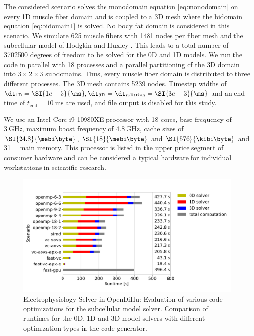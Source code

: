 The considered scenario solves the monodomain equation \cref{eq:monodomain} on every 1D muscle fiber domain and is coupled to a 3D mesh where the bidomain equation \cref{eq:bidomain1} is solved. No body fat domain is considered in this scenario.
We simulate 625 muscle fibers with 1481 nodes per fiber mesh and the subcellular model of Hodgkin and Huxley \cite{Hodgkin1952}. This leads to a total number of \num{3702500} degrees of freedom to be solved for the 0D and 1D models.
We run the code in parallel with 18 processes and a parallel partitioning of the 3D domain into $3 \times 2 \times 3$ subdomains. Thus, every muscle fiber domain is distributed to three different processes.
The 3D mesh contains 5239 nodes. Timestep widths of $\dt_\text{1D} = \SI{1e-3}{\ms}, \dt_\text{3D} = \dt_\text{splitting} = \SI{3e-3}{\ms}$ and an end time of $t_\text{end} = \SI{10}{\ms}$ are used, and file output is disabled for this study.

We use an Intel Core i9-10980XE processor with 18 cores, base frequency of $\SI{3}{\giga\hertz}$, maximum boost frequency of $\SI{4.8}{\giga\hertz}$, cache sizes of 
$\SI{24.8}{\mebi\byte}$, $\SI{18}{\mebi\byte}$ and $\SI{576}{\kibi\byte}$ and \SI{31}{\gibi\byte} main memory. This processor is listed in the upper price segment of consumer hardware and can be considered a typical hardware for individual workstations in scientific research.

\begin{figure}
  \centering%
  \includegraphics[width=\textwidth]{images/results/studies/fibers_emg_study.pdf}%
  \caption{Electrophysiology Solver in OpenDiHu: Evaluation of various code optimizations for the subcellular model solver. Comparison of runtimes for the 0D, 1D and 3D model solvers with different optimization types in the code generator.}%
  \label{fig:fibers_emg_study}%
\end{figure}%

